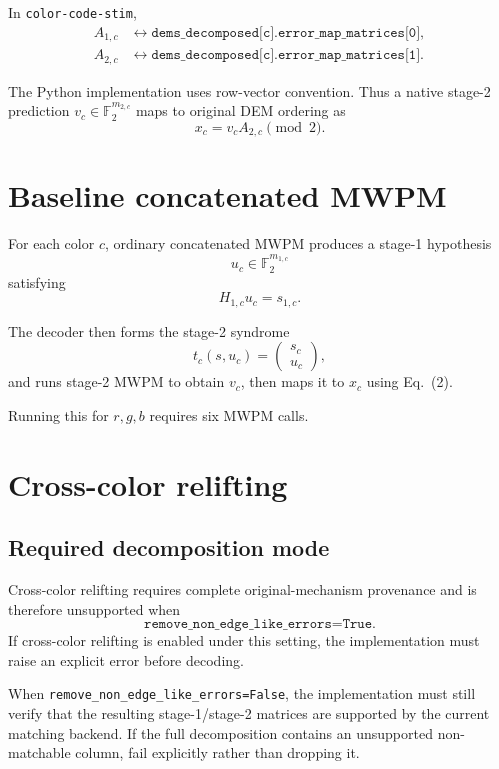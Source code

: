 \documentclass[11pt]{article}
\newcommand{\F}{\mathbb{F}_2}
\begin{document}
In \texttt{color-code-stim},
\begin{align*}
A_{1,c}
&\leftrightarrow
\texttt{dems\_decomposed[c].error\_map\_matrices[0]},\\
A_{2,c}
&\leftrightarrow
\texttt{dems\_decomposed[c].error\_map\_matrices[1]}.
\end{align*}

The Python implementation uses row-vector convention. Thus a native stage-2
prediction $v_c\in\F^{m_{2,c}}$ maps to original DEM ordering as
\[
    x_c=v_cA_{2,c}\pmod 2.
    \tag{2}
\]

\section{Baseline concatenated MWPM}

For each color $c$, ordinary concatenated MWPM produces a stage-1 hypothesis
\[
    u_c\in\F^{m_{1,c}}
\]
satisfying
\[
    H_{1,c}u_c=s_{1,c}.
    \tag{3}
\]

The decoder then forms the stage-2 syndrome
\[
    t_c(s,u_c)=
    \begin{pmatrix}
      s_c\\
      u_c
    \end{pmatrix},
    \tag{4}
\]
and runs stage-2 MWPM to obtain $v_c$, then maps it to $x_c$ using Eq.~(2).

Running this for $r,g,b$ requires six MWPM calls.

\section{Cross-color relifting}

\subsection{Required decomposition mode}

Cross-color relifting requires complete original-mechanism provenance and is
therefore unsupported when
\[
    \texttt{remove\_non\_edge\_like\_errors=True}.
\]
If cross-color relifting is enabled under this setting, the implementation must
raise an explicit error before decoding.

When \texttt{remove\_non\_edge\_like\_errors=False}, the implementation must
still verify that the resulting stage-1/stage-2 matrices are supported by the
current matching backend. If the full decomposition contains an unsupported
non-matchable column, fail explicitly rather than dropping it.
\end{document}
